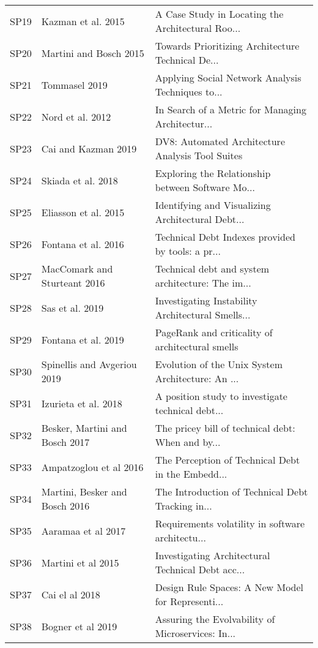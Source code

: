 \begin{tabular}{lll}
 SP19 &              Kazman et al. 2015 &  A Case Study in Locating the Architectural Roo... \\
 SP20 &          Martini and Bosch 2015 &  Towards Prioritizing Architecture Technical De... \\
 SP21 &                   Tommasel 2019 &  Applying Social Network Analysis Techniques to... \\
 SP22 &                Nord et al. 2012 &  In Search of a Metric for Managing Architectur... \\
 SP23 &             Cai and Kazman 2019 &  DV8: Automated Architecture Analysis Tool Suites  \\
 SP24 &              Skiada et al. 2018 &  Exploring the Relationship between Software Mo... \\
 SP25 &            Eliasson et al. 2015 &  Identifying and Visualizing Architectural Debt... \\
 SP26 &             Fontana et al. 2016 &  Technical Debt Indexes provided by tools: a pr... \\
 SP27 &    MacComark and Sturteant 2016 &  Technical debt and system architecture: The im... \\
 SP28 &                 Sas et al. 2019 &  Investigating Instability Architectural Smells... \\
 SP29 &             Fontana et al. 2019 &   PageRank and criticality of architectural smells \\
 SP30 &     Spinellis and Avgeriou 2019 &  Evolution of the Unix System Architecture: An ... \\
 SP31 &            Izurieta et al. 2018 &  A position study to investigate technical debt... \\
 SP32 &  Besker, Martini and Bosch 2017 &  The pricey bill of technical debt: When and by... \\
 SP33 &          Ampatzoglou et al 2016 &  The Perception of Technical Debt in the Embedd... \\
 SP34 &  Martini, Besker and Bosch 2016 &  The Introduction of Technical Debt Tracking in... \\
 SP35 &              Aaramaa et al 2017 &  Requirements volatility in software architectu... \\
 SP36 &              Martini et al 2015 &  Investigating Architectural Technical Debt acc... \\
 SP37 &                  Cai el al 2018 &  Design Rule Spaces: A New Model for Representi... \\
 SP38 &               Bogner et al 2019 &  Assuring the Evolvability of Microservices: In... \\

\end{tabular}

